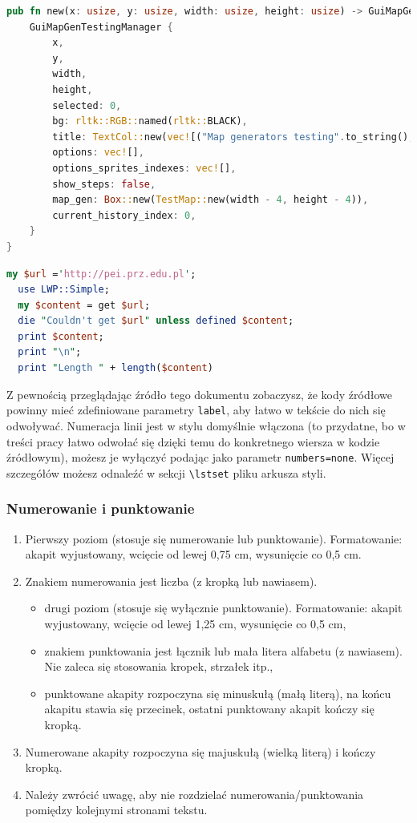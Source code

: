 \documentclass[12pt,twoside]{article}
\begin{document}
\begin{lstlisting}[language=Rust,caption=Listing programu Matlab,label={KodMatlab1}]
pub fn new(x: usize, y: usize, width: usize, height: usize) -> GuiMapGenTestingManager {
	GuiMapGenTestingManager {
		x,
		y,
		width,
		height,
		selected: 0,
		bg: rltk::RGB::named(rltk::BLACK),
		title: TextCol::new(vec![("Map generators testing".to_string(),rltk::RGB::named(rltk::WHITE))]),
		options: vec![],
		options_sprites_indexes: vec![],
		show_steps: false,
		map_gen: Box::new(TestMap::new(width - 4, height - 4)),
		current_history_index: 0,
	}
}
\end{lstlisting}

\begin{lstlisting}[language=Perl,caption=Listing programu Perl,label={KodPerl1}]
  my $url ='http://pei.prz.edu.pl';
  use LWP::Simple;
  my $content = get $url;
  die "Couldn't get $url" unless defined $content;
  print $content;
  print "\n";
  print "Length " + length($content)
\end{lstlisting}

Z pewnością przeglądając źródło tego dokumentu zobaczysz, że kody źródłowe powinny mieć zdefiniowane parametry \verb|label|, aby łatwo w tekście do nich się odwoływać.
Numeracja linii jest w stylu domyślnie włączona (to przydatne, bo w treści pracy łatwo odwołać się dzięki temu do konkretnego wiersza w kodzie źródłowym), możesz je wyłączyć podając jako parametr \verb|numbers=none|. Więcej szczegółów możesz odnaleźć w sekcji \verb|\lstset| pliku arkusza styli. 


\subsubsection{Numerowanie i punktowanie}

\begin{enumerate}[label=\arabic*), leftmargin=1.25cm]
	\item Pierwszy poziom (stosuje się numerowanie lub punktowanie). Formatowanie:
	akapit wyjustowany, wcięcie od lewej 0,75 cm, wysunięcie co 0,5 cm.
	\item Znakiem numerowania jest liczba (z kropką lub nawiasem).
		\begin{itemize}[label=-,labelsep=0.4cm,leftmargin=0.6cm]
			\item drugi poziom (stosuje się wyłącznie punktowanie). Formatowanie: akapit
			wyjustowany, wcięcie od lewej 1,25 cm, wysunięcie co 0,5 cm,
			\item znakiem punktowania jest łącznik lub mała litera alfabetu (z nawiasem). Nie
			zaleca się stosowania kropek, strzałek itp.,
			\item punktowane akapity rozpoczyna się minuskułą (małą literą), na końcu akapitu
			stawia się przecinek, ostatni punktowany akapit kończy się kropką.
		\end{itemize}
	\item Numerowane akapity rozpoczyna się majuskułą (wielką literą) i kończy kropką.
	\item Należy zwrócić uwagę, aby nie rozdzielać numerowania/punktowania pomiędzy
	kolejnymi stronami tekstu.
\end{enumerate}
\end{document}
